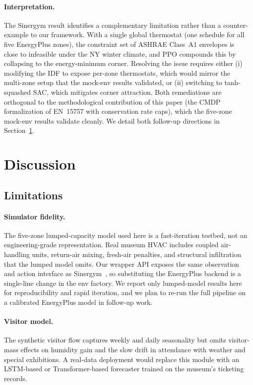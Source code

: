\documentclass[11pt,a4paper]{article}
\begin{document}
\paragraph{Interpretation.}
The Sinergym result identifies a complementary limitation rather than
a counter-example to our framework. With a single global thermostat
(one schedule for all five EnergyPlus zones), the constraint set of
ASHRAE Class~A1 envelopes is close to infeasible under the NY winter
climate, and PPO compounds this by collapsing to the energy-minimum
corner. Resolving the issue requires either (i) modifying the IDF to
expose per-zone thermostats, which would mirror the multi-zone setup
that the mock-env results validated, or (ii) switching to
tanh-squashed SAC, which mitigates corner attraction. Both
remediations are orthogonal to the methodological contribution of this
paper (the CMDP formalization of EN~15757 with conservation rate
caps), which the five-zone mock-env results validate cleanly. We
detail both follow-up directions in Section~\ref{sec:discussion}.

\section{Discussion}\label{sec:discussion}

\subsection{Limitations}

\paragraph{Simulator fidelity.}
The five-zone lumped-capacity model used here is a fast-iteration
testbed, not an engineering-grade representation. Real museum HVAC
includes coupled air-handling units, return-air mixing, fresh-air
penalties, and structural infiltration that the lumped model omits.
Our wrapper API exposes the same observation and action interface as
Sinergym~\citep{manjavacas2024sinergym}, so substituting the
EnergyPlus backend is a single-line change in the env factory. We
report only lumped-model results here for reproducibility and rapid
iteration, and we plan to re-run the full pipeline on a calibrated
EnergyPlus model in follow-up work.

\paragraph{Visitor model.}
The synthetic visitor flow captures weekly and daily seasonality but
omits visitor-mass effects on humidity gain and the slow drift in
attendance with weather and special exhibitions. A real-data
deployment would replace this module with an LSTM-based or
Transformer-based forecaster trained on the museum's ticketing
records.
\end{document}
